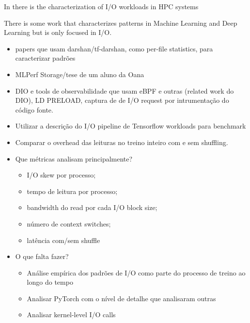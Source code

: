 \documentclass[conference]{IEEEtran}
\begin{document}
In there is the characterization of I/O workloads in HPC systems

There is some work that characterizes patterns in Machine Learning \cite{OanaML} and Deep Learning \cite{OanaDL} but is only focused in I/O.

\begin{itemize}
    \item papers que usam darshan/tf-darshan, como per-file statistics, para caracterizar padrões \cite{tfdarshan} \cite{zoomin} 
    \item MLPerf Storage/tese de um aluno da Oana
    \item DIO e tools de observabilidade que usam eBPF e outras (related work do DIO), LD PRELOAD, captura de de I/O request por intrumentação do código fonte.
    \item Utilizar a descrição do I/O pipeline de Tensorflow workloads para benchmark \cite{TFbenchmark}
    \item Comparar o overhead das leituras no treino inteiro com e sem shuffling. \cite{initial}
    \item Que métricas analisam principalmente?
    \begin{itemize}
        \item I/O skew por processo;
        \item tempo de leitura por processo;
        \item bandwidth do read por cada I/O block size;
        \item número de context switches;
        \item latência com/sem shuffle
    \end{itemize} 
    \item O que falta fazer?
    \begin{itemize}
        \item Análise empírica dos padrões de I/O como parte do processo de treino ao longo do tempo
        \item Analisar PyTorch com o nível de detalhe que analisaram outras
        \item Analisar kernel-level I/O calls 
    \end{itemize}
\end{itemize}
\end{document}
